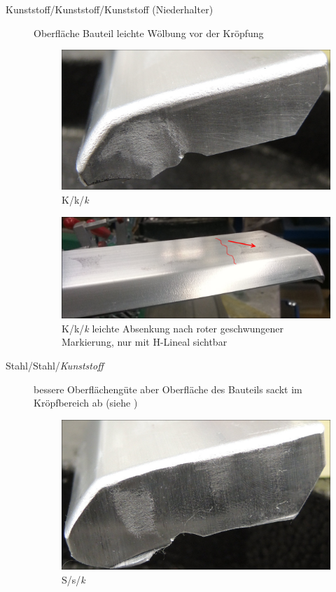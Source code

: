 \documentclass[12pt,a4paper,parskip,twoside,BCOR5mm,headsepline]{scrartcl}
\begin{document}
\begin{description*}
\begin{description}
\item[Kunststoff/Kunststoff/Kunststoff (Niederhalter)] Oberfläche Bauteil leichte Wölbung vor der Kröpfung
\begin{figure}[H]
\centering
\includegraphics[width=.8\textwidth]{Kkk1}
\caption{K/k/\emph{k}}
\label{fig:Kkk1}
\end{figure}
\begin{figure}[H]
\centering
\includegraphics[width=.8\textwidth]{BauteilAbsenkSk3}
\caption{K/k/\emph{k} leichte Absenkung nach roter geschwungener Markierung, nur mit H-Lineal sichtbar}
\label{fig:sKs3}
\end{figure}

\item[Stahl/Stahl/\emph{Kunststoff}] bessere Oberflächengüte aber Oberfläche des Bauteils sackt im Kröpfbereich ab (siehe )
\begin{figure}[H]
\centering
\includegraphics[width=.8\textwidth]{Ssk1}
\caption{S/s/\emph{k}}
\label{fig:Ssk1}
\end{figure}












\end{description}
\end{description*}
\end{document}
